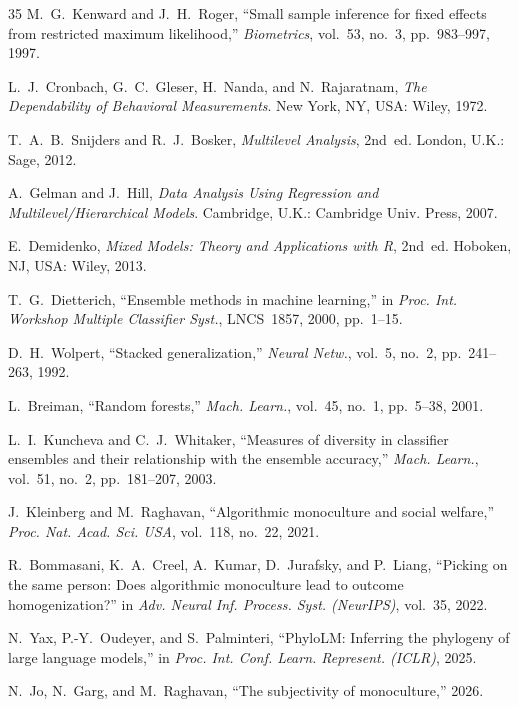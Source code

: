 \documentclass[journal]{IEEEtran}
\begin{document}
\begin{thebibliography}{35}
M.~G.~Kenward and J.~H.~Roger, ``Small sample inference for fixed effects from restricted maximum likelihood,'' \emph{Biometrics}, vol.~53, no.~3, pp.~983--997, 1997.

L.~J.~Cronbach, G.~C.~Gleser, H.~Nanda, and N.~Rajaratnam, \emph{The Dependability of Behavioral Measurements}. New York, NY, USA: Wiley, 1972.

T.~A.~B.~Snijders and R.~J.~Bosker, \emph{Multilevel Analysis}, 2nd~ed. London, U.K.: Sage, 2012.

A.~Gelman and J.~Hill, \emph{Data Analysis Using Regression and Multilevel/Hierarchical Models}. Cambridge, U.K.: Cambridge Univ. Press, 2007.

E.~Demidenko, \emph{Mixed Models: Theory and Applications with R}, 2nd~ed. Hoboken, NJ, USA: Wiley, 2013.

T.~G.~Dietterich, ``Ensemble methods in machine learning,'' in \emph{Proc. Int. Workshop Multiple Classifier Syst.}, LNCS~1857, 2000, pp.~1--15.

D.~H.~Wolpert, ``Stacked generalization,'' \emph{Neural Netw.}, vol.~5, no.~2, pp.~241--263, 1992.

L.~Breiman, ``Random forests,'' \emph{Mach. Learn.}, vol.~45, no.~1, pp.~5--38, 2001.

L.~I.~Kuncheva and C.~J.~Whitaker, ``Measures of diversity in classifier ensembles and their relationship with the ensemble accuracy,'' \emph{Mach. Learn.}, vol.~51, no.~2, pp.~181--207, 2003.

J.~Kleinberg and M.~Raghavan, ``Algorithmic monoculture and social welfare,'' \emph{Proc. Nat. Acad. Sci. USA}, vol.~118, no.~22, 2021.

R.~Bommasani, K.~A.~Creel, A.~Kumar, D.~Jurafsky, and P.~Liang, ``Picking on the same person: Does algorithmic monoculture lead to outcome homogenization?'' in \emph{Adv. Neural Inf. Process. Syst. (NeurIPS)}, vol.~35, 2022.

N.~Yax, P.-Y.~Oudeyer, and S.~Palminteri, ``PhyloLM: Inferring the phylogeny of large language models,'' in \emph{Proc. Int. Conf. Learn. Represent. (ICLR)}, 2025.

N.~Jo, N.~Garg, and M.~Raghavan, ``The subjectivity of monoculture,'' 2026.


\end{thebibliography}
\end{document}
